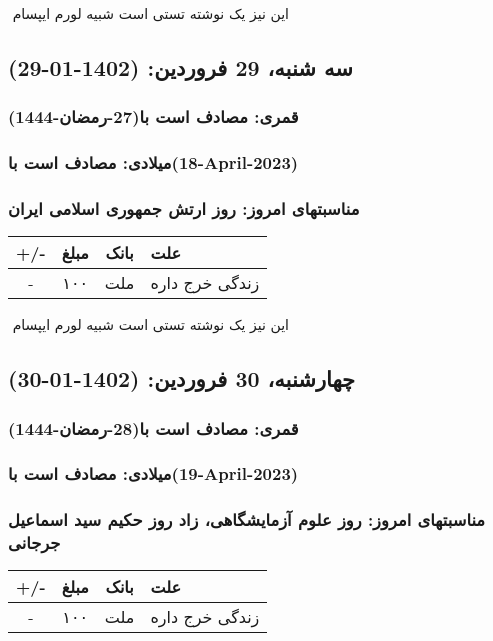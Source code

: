 \documentclass{article}
\newcommand{\rnote}[1]{\marginpar{\textcolor{color}{\StrSubstitute{\##1}{ }{\_}}}}
\newcommand{\myRow}[4]{
    #1 & #2 & #3 & #4 \\ \hline
}
\begin{document}
‌
\rnote{تست}
این نیز یک نوشته تستی است شبیه لورم ایپسام




\newpage
{}
\textcolor{color}{
\section{ سه شنبه، 29 فروردین: (1402-01-29) }
\subsubsection*{قمری: مصادف است با(27-رمضان-1444)} 
\subsubsection*{میلادی: مصادف است با(18-April-2023)}
\subsubsection*{مناسبتهای امروز: روز ارتش جمهوری اسلامی ایران}
}


\begin{tabular}{ | c | c | c | p{5cm} |}
    \hline
    \myRow{ +/- }{مبلغ}{بانک}{علت}
    \myRow{-}{۱۰۰}{ملت}{زندگی خرج داره}
\end{tabular}
\newline
\newline

‌
\rnote{تست}
این نیز یک نوشته تستی است شبیه لورم ایپسام




\newpage
{}
\textcolor{color}{
\section{ چهارشنبه، 30 فروردین: (1402-01-30) }
\subsubsection*{قمری: مصادف است با(28-رمضان-1444)} 
\subsubsection*{میلادی: مصادف است با(19-April-2023)}
\subsubsection*{مناسبتهای امروز: روز علوم آزمایشگاهی، زاد روز حکیم سید اسماعیل جرجانی}
}


\begin{tabular}{ | c | c | c | p{5cm} |}
    \hline
    \myRow{ +/- }{مبلغ}{بانک}{علت}
    \myRow{-}{۱۰۰}{ملت}{زندگی خرج داره}
\end{tabular}
\newline
\newline
\end{document}
